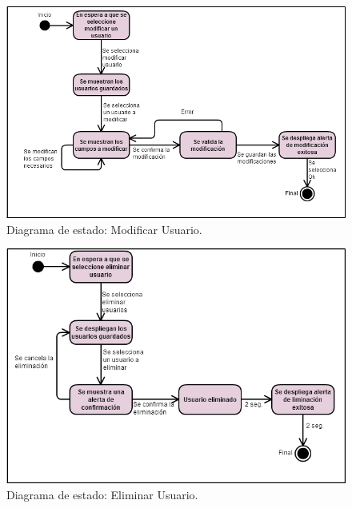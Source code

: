 \begin{figure}[htb]
	\label{dde2}
	\begin{center}
		\includegraphics[scale=0.5]{imagenes/ModificarUsuario.png}
	\end{center}
	\caption{Diagrama de estado: Modificar Usuario.}
\end{figure}


\begin{figure}[htb]
	\label{dde3}
	\begin{center}
		\includegraphics[scale=0.5]{imagenes/EliminarUser2.png}
	\end{center}
	\caption{Diagrama de estado: Eliminar Usuario.}
\end{figure}

